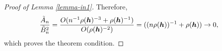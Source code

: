 \documentclass[oneside,11pt]{article}
\begin{document}
\begin{proof}[Proof of Lemma \ref{lemma-in1}]
Therefore,
\begin{align*}
    \frac{\tilde{A}_n}{\tilde{B}_n^2}=\frac{O(n^{-1}\rho({\boldsymbol{h}})^{-3} + \rho({\boldsymbol{h}})^{-1})}{O(\rho({\boldsymbol{h}})^{-2})} = ((n\rho({\boldsymbol{h}}))^{-1}+\rho({\boldsymbol{h}})) \to 0,
\end{align*}
which proves the theorem condition.

\end{proof}
\end{document}
